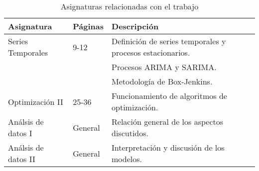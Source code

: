 \documentclass[12pt,twoside]{article}
\begin{document}
\begin{table}[ht] 
\centering
\begin{tabular}{llll} 
  \hline
 Asignatura & Páginas & Descripción  \\ 
  \hline
Series Temporales   & 9-12 & Definición de series temporales y procesos estacionarios. \\
& & Procesos ARIMA y SARIMA. \\
& & Metodología de Box-Jenkins.  \\
Optimización II  & 25-36 & Funcionamiento de algoritmos de optimización. \\
Análsis de datos I  & General & Relación general de los aspectos discutidos. \\ 
Análsis de datos II & General & Interpretación y discusión de los modelos. \\ 
\hline
\end{tabular}
\caption{Asignaturas relacionadas con el trabajo} \label{tab{03}}
\end{table}
\end{document}
